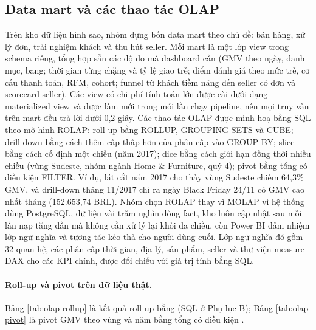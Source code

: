 \subsection{Data mart và các thao tác OLAP}
Trên kho dữ liệu hình sao, nhóm dựng bốn data mart theo chủ đề: bán hàng, xử lý đơn, trải nghiệm khách và thu hút seller. Mỗi mart là một lớp view trong schema riêng, tổng hợp sẵn các độ đo mà dashboard cần (GMV theo ngày, danh mục, bang; thời gian từng chặng và tỷ lệ giao trễ; điểm đánh giá theo mức trễ, cơ cấu thanh toán, RFM, cohort; funnel từ khách tiềm năng đến seller có đơn và scorecard seller). Các view có chi phí tính toán lớn được cài dưới dạng materialized view và được làm mới trong mỗi lần chạy pipeline, nên mọi truy vấn trên mart đều trả lời dưới 0,2 giây. Các thao tác OLAP được minh hoạ bằng SQL theo mô hình ROLAP: roll-up bằng ROLLUP, GROUPING SETS và CUBE; drill-down bằng cách thêm cấp thấp hơn của phân cấp vào GROUP BY; slice bằng cách cố định một chiều (năm 2017); dice bằng cách giới hạn đồng thời nhiều chiều (vùng Sudeste, nhóm ngành Home \& Furniture, quý 4); pivot bằng tổng có điều kiện FILTER. Ví dụ, lát cắt năm 2017 cho thấy vùng Sudeste chiếm 64,3\% GMV, và drill-down tháng 11/2017 chỉ ra ngày Black Friday 24/11 có GMV cao nhất tháng (152.653,74 BRL). Nhóm chọn ROLAP thay vì MOLAP vì hệ thống dùng PostgreSQL, dữ liệu vài trăm nghìn dòng fact, kho luôn cập nhật sau mỗi lần nạp tăng dần mà không cần xử lý lại khối đa chiều, còn Power BI đảm nhiệm lớp ngữ nghĩa và tương tác kéo thả cho người dùng cuối. Lớp ngữ nghĩa đó gồm 32 quan hệ, các phân cấp thời gian, địa lý, sản phẩm, seller và thư viện measure DAX cho các KPI chính, được đối chiếu với giá trị tính bằng SQL.


\paragraph{Roll-up và pivot trên dữ liệu thật.} Bảng \ref{tab:olap-rollup} là kết quả roll-up bằng  (SQL ở Phụ lục B); Bảng \ref{tab:olap-pivot} là pivot GMV theo vùng và năm bằng tổng có điều kiện .


